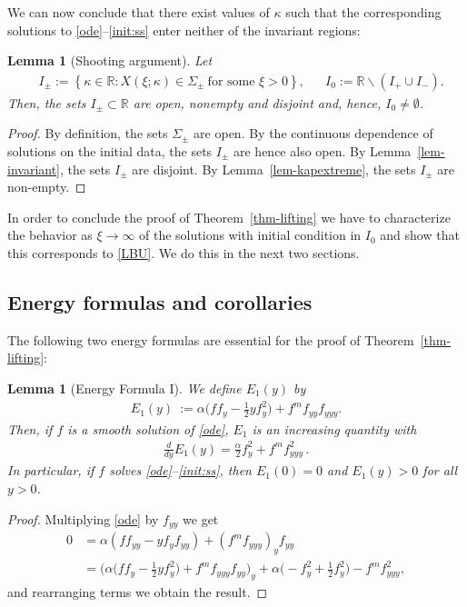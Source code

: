 \documentclass{article}%
\newtheorem{lemma}[theorem]{Lemma}
\newcommand{\alp}{\alpha}
\newcommand{\R}{\mathbb{R}}
\begin{document}
We can now conclude that there exist values of $\kappa$ such that the
corresponding solutions to \eqref{ode}--\eqref{init:ss} enter neither of the
invariant regions:
\begin{lemma}[Shooting argument] \label{lem-shooting} %
  Let
  \begin{align*}
    & I_{\pm} := \left\{ \kappa\in\mathbb{R}:X\left( \xi;\kappa\right) \in
      \Sigma_{\pm}\ \text{for some }\xi>0\right\}, %
    && I_{0} := \R \backslash(I_{+} \cup I_{-}).
  \end{align*}
Then, the sets $I_{\pm} \subset\R$ are open, nonempty and disjoint and, hence, $I_{0} \neq\emptyset$.
\end{lemma}
\begin{proof}
By definition, the sets $\Sigma_\pm$ are open. By the continuous dependence of 
solutions on the initial data, the sets $I_\pm$ are hence also open. By 
Lemma~\ref{lem-invariant}, the sets $I_\pm$ are disjoint. By Lemma~\ref{lem-kapextreme}, 
the sets $I_\pm$ are non-empty. 
\end{proof}


In order to conclude the proof of Theorem~\ref{thm-lifting} we have to characterize the behavior 
as $\xi\to\infty$ of the solutions with initial condition in $I_0$ and show that this corresponds to 
\eqref{LBU}. We do this in the next two sections.


\subsection{Energy formulas and corollaries} \label{sec-energies} %

The following two energy formulas are essential for the proof of Theorem~\ref{thm-lifting}:
\begin{lemma} [Energy Formula I]\label{lem-E1} %
We define $E_{1}(y)$ by
\begin{align}\label{E1-y}
    E_{1}(y) \ := \alp\Big(f f_{y}-\frac{1}{2}y f_{y}^2\Big) + f^{m}f_{yy}f_{yyy}.
\end{align}
Then, if $f$ is a smooth solution of \eqref{ode}, $E_{1}$ is an increasing quantity with
\begin{align}\label{D1-y}
    \frac{d}{dy} E_{1}(y) =\frac{\alp}{2}f_{y}^{2} + f^{m} f_{yyy}^{2}\,.
\end{align}
In particular, if $f$ solves \eqref{ode}--\eqref{init:ss}, then 
$E_1(0) = 0$ and $E_1(y) > 0$ for all $y > 0$.
\end{lemma}
\begin{proof}
Multiplying \eqref{ode} by $f_{yy}$ we get
\begin{align*}
    0 &= \alp\left(f f_{yy} - yf_y f_{yy} \right)+ (f^m f_{yyy})_y f_{yy} \\ %
    &= \big( \alp\big(f f_{y} - \frac 12 y f_y^2 \big)+ f^m f_{yyy} f_{yy}\big)_y + \alp\big(- f_y^2 +
      \frac 12 f_y^2\big) - f^m f_{yyy}^2,
\end{align*}
and rearranging terms we obtain the result.
\end{proof}
\end{document}
